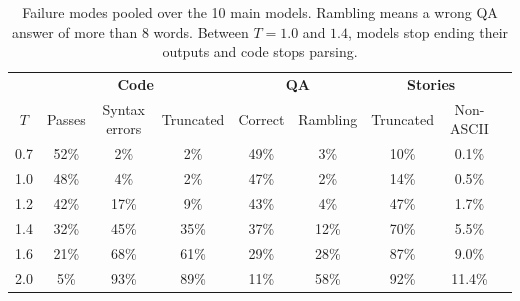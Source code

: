 \begin{table}[t]
    \centering
    \begin{tabular}{@{}ccccccccc@{}}
        \toprule
        & \multicolumn{3}{c}{\textbf{Code}} & \multicolumn{2}{c}{\textbf{QA}} & \multicolumn{2}{c}{\textbf{Stories}} \\
        \cmidrule(lr){2-4} \cmidrule(lr){5-6} \cmidrule(lr){7-8}
        \textbf{$T$} & Passes & Syntax errors & Truncated & Correct & Rambling & Truncated & Non-ASCII \\
        \midrule
        0.7 & 52\% & 2\% & 2\% & 49\% & 3\% & 10\% & 0.1\% \\
        1.0 & 48\% & 4\% & 2\% & 47\% & 2\% & 14\% & 0.5\% \\
        1.2 & 42\% & 17\% & 9\% & 43\% & 4\% & 47\% & 1.7\% \\
        1.4 & 32\% & 45\% & 35\% & 37\% & 12\% & 70\% & 5.5\% \\
        1.6 & 21\% & 68\% & 61\% & 29\% & 28\% & 87\% & 9.0\% \\
        2.0 & 5\% & 93\% & 89\% & 11\% & 58\% & 92\% & 11.4\% \\
        \bottomrule
    \end{tabular}
    \caption{Failure modes pooled over the 10 main models. Rambling means a wrong QA answer of more than 8 words. Between $T = 1.0$ and $1.4$, models stop ending their outputs and code stops parsing.}
    \label{tab:failures}
\end{table}
